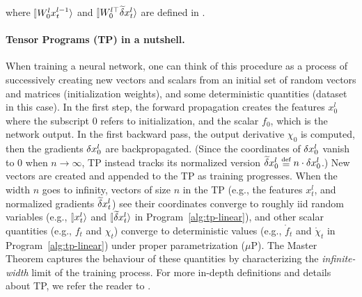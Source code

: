 \documentclass{article}
\theoremstyle{plain}
\theoremstyle{definition}
\begin{document}
\begin{algorithm}[ht]
\caption{Random Variables induced from Tensor Program for the Linear Network with LR $\eta =1$ and frozen $U, V$. }\label{alg:tp-linear}
where $\ket{W_0^l x_t^{l-1}}$ and $\ket{W_0^{l\top} \tilde\del x_t^l}$ are defined in .
\end{algorithm}

\paragraph{Tensor Programs (TP) in a nutshell.} When training a neural network, one can think of this procedure as a process of successively creating new vectors and scalars from an initial set of random vectors and matrices (initialization weights), and some deterministic quantities (dataset in this case). In the first step, the forward propagation creates the features $x^l_0$ where the subscript $0$ refers to initialization, and the scalar $f_0$, which is the network output. In the first backward pass, the output derivative $\chi_0$ is computed, then the gradients $\delta x^l_0$ are backpropagated. (Since the coordinates of  $\delta x_0^l$ vanish to 0 when $n\to \infty$, TP instead tracks its normalized version $\tilde\del x_0^l\defeq n\cdot \del x_0^l$.) New vectors are created and appended to the TP as training progresses. When the width $n$ goes to infinity, vectors of size $n$ in the TP (e.g., the features $x^l_t$, and normalized gradients $\widetilde{\delta} x^l_t$) see their coordinates converge to roughly iid random variables (e.g., $\ket{x^l_t}$ and $\ket{\tilde\del x^l_t}$ in Program~\ref{alg:tp-linear}), and other scalar quantities (e.g., $f_t$ and $\chi_t$) converge to deterministic values (e.g., $\mathring f_t$ and $\mathring \chi_t$ in Program~\ref{alg:tp-linear}) under proper parametrization ($\mu$P). The Master Theorem \citep{yang2022tensor} captures the behaviour of these quantities by characterizing the \emph{infinite-width} limit of the training process. For more in-depth definitions and details about TP, we refer the reader to \cite{yang2022tensor}.
\end{document}
